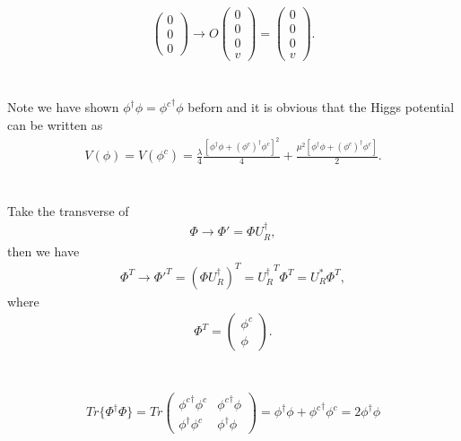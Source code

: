 \documentclass[11pt]{article}
\begin{document}
\begin{itemize}
\begin{eqnarray}
\begin{pmatrix}
            0\\0\\0
        \end{pmatrix}
        \to
        O
        \begin{pmatrix}
            0\\0\\0\\v
        \end{pmatrix}
        =        
        \begin{pmatrix}
            0\\0\\0\\v
        \end{pmatrix}.
    \end{eqnarray}
\end{itemize}
    
\section{ }
Note we have shown $\phi^\dagger \phi={\phi^c}^\dagger \phi$ beforn and it is obvious that the Higgs potential can be written as  \begin{eqnarray}
    V(\phi)
    = V(\phi^c)
    = \frac{\lambda}{4} \frac{[\phi^\dagger \phi + (\phi^c)^\dagger \phi^c]^2}{4}
         +\frac{\mu^2 [\phi^\dagger \phi + (\phi^c)^\dagger \phi^c]}{2}.
  \end{eqnarray}

\section{ }
Take the transverse of
\begin{eqnarray}
    \Phi \to \Phi' = \Phi U_R^\dagger,
  \end{eqnarray}
then we have
\begin{eqnarray}
    \Phi^T \to \Phi'^T = (\Phi U_R^\dagger)^T={ U_R^\dagger}^T \Phi^T= U_R^* \Phi^T,
\end{eqnarray}
  where
  \begin{eqnarray}
    \Phi^T = 
    \begin{pmatrix}
      \phi^c \\  \phi
    \end{pmatrix}.
  \end{eqnarray}

\section{ }
\begin{eqnarray}
    Tr\{ \Phi^\dagger \Phi \}
      = Tr
          \begin{pmatrix}
              {\phi^c}^\dagger \phi^c  & {\phi^c}^\dagger \phi \\ \phi^\dagger \phi^c & \phi^\dagger \phi
          \end{pmatrix}
      =\phi^\dagger \phi + {\phi^c}^\dagger \phi^c
      = 2 \phi^\dagger \phi
\end{eqnarray}
\end{document}
